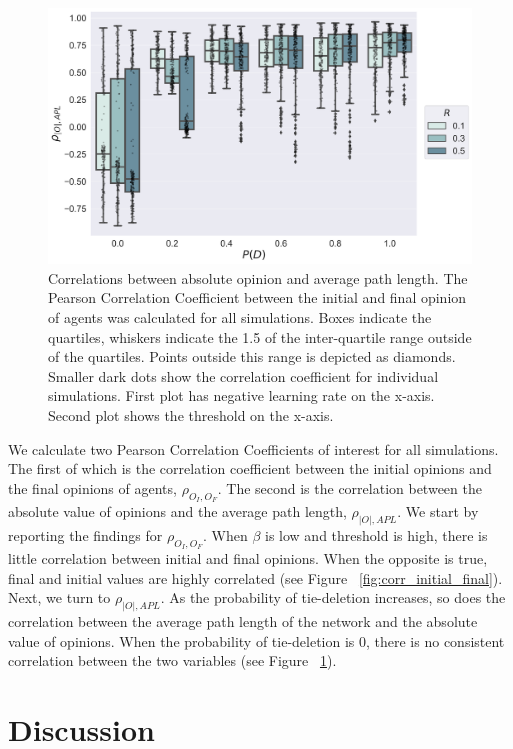\documentclass{article}
\begin{document}
\begin{figure}[H]
    \centering
    \includegraphics[width=.8\linewidth]{../plots/overall/Tie_Dissolution_Correlations_Boxplot_Full.png}
  \caption{Correlations between absolute opinion and average path length. The Pearson Correlation Coefficient between the initial and final opinion of agents was calculated for all simulations. Boxes indicate the quartiles, whiskers indicate the 1.5 of the inter-quartile range outside of the quartiles. Points outside this range is depicted as diamonds. Smaller dark dots show the correlation coefficient for individual simulations. First plot has negative learning rate on the x-axis. Second plot shows the threshold on the x-axis. }
  \label{fig:corr_abs_path}
\end{figure}

We calculate two Pearson Correlation Coefficients of interest for all simulations. The first of which is the correlation coefficient between the initial opinions and the final opinions of agents, $\rho_{O_I, O_F}$. The second is the correlation between the absolute value of opinions and the average path length, $\rho_{|O|, APL}$.
We start by reporting the findings for $\rho_{O_I, O_F}$. When $\beta$ is low and threshold is high, there is little correlation between initial and final opinions. When the opposite is true, final and initial values are highly correlated (see Figure ~\ref{fig:corr_initial_final}). 
Next, we turn to $\rho_{|O|, APL}$. As the probability of tie-deletion increases, so does the correlation between the average path length of the network and the absolute value of opinions. When the probability of tie-deletion is 0, there is no consistent correlation between the two variables (see Figure ~\ref{fig:corr_abs_path}). 


\section{Discussion}
\end{document}

